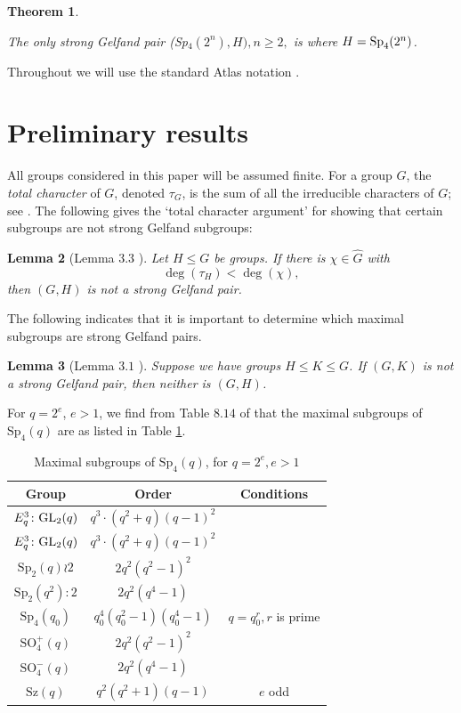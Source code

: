 \documentclass{amsart}
\newtheorem{thm}{Theorem}[section]
\newtheorem{lem}[thm]{Lemma}
\begin{document}
\begin{thm}\label{Thm1}

The only strong Gelfand pair {\rm (Sp}$_4(2^n),H),n\ge 2,$ is where $H={\rm Sp}_4(2^n)$. 
\end{thm}
 

Throughout we will use the standard  Atlas notation \cite {Atl}.
\medskip 




\section{Preliminary results}
\FloatBarrier


All groups considered in this paper will be assumed finite. 
For a  group $G$, the \textit{total character} of $G$, denoted $\tau_G$, is the sum of all the irreducible characters of $G$; see \cite {Tot1,Tot3,Tot2}. The following gives the `total character argument' for showing that certain subgroups are not strong Gelfand subgroups:

\begin{lem} [Lemma $3.3$ \cite {GH}] \label{lem:totalchar} Let $H\leq G$ be   groups. If there is  $\chi\in \hat G$ with 
$$
\deg(\tau_H) < \deg(\chi),
$$
 then $(G, H)$ is not a strong Gelfand pair.
\end{lem}

The following indicates that it is important to determine which maximal subgroups are strong Gelfand pairs. 


\begin{lem}  [Lemma $3.1$ \cite {BH}]  \label{lem:totalstack} Suppose we have groups $H\leq K\leq G$. If $(G, K)$ is not a strong Gelfand pair, then neither is $(G, H)$.
\end{lem}



For  $q=2^e$,  $e>1$, we find from Table $8.14$ of \cite{max} that   the maximal subgroups of $\mathrm{Sp}_4(q)$  are as listed in Table \ref{maxeven}.

\begin{table}[h!]
\centering
\caption{Maximal subgroups of $\mathrm{Sp}_4(q)$, for $q=2^e, e>1$}
\label{maxeven}
\vspace{5pt}
\begin{tabular}{|ccc|}
\hline
Group & Order& Conditions\\
\hline
$\vphantom{E^{3^2}}E_q^3\colon\mathrm{GL}_2(q)$ & $q^3\cdot (q^2+q)(q-1)^2$ & \\%
$\vphantom{E^{3^2}}E_q^3\colon\mathrm{GL}_2(q)$ & $q^3\cdot (q^2+q)(q-1)^2$ & \\%
$\mathrm{Sp}_2(q)\wr 2$ & $2q^2(q^2-1)^2$ & \\%
$\mathrm{Sp}_2(q^2)\colon 2$ & $2q^2(q^4-1)$ & \\
$\mathrm{Sp}_4(q_0)$ & $q_0^4(q_0^2-1)(q_0^4-1)$ & $q=q_0^r, r$ is prime\\%
$\mathrm{SO}_4^+(q)$ & $2q^2(q^2-1)^2$ & \\
$\mathrm{SO}_4^-(q)$ & $2q^2(q^4-1)$ & \\
$\mathrm{Sz}(q)$ & $q^2(q^2+1)(q-1)$ & $e$ odd\\%
\hline
\end{tabular}
\end{table}
\end{document}
